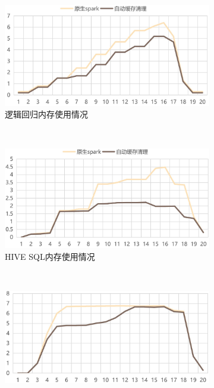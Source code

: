 \begin{figure}[!htbp]
    \centering
    \begin{subfigure}[b]{0.45\linewidth}
      \includegraphics[width=\textwidth]{Img/lr-use.jpg}
      \caption{逻辑回归内存使用情况}
      \label{fig:lr-use}
    \end{subfigure}%
    ~%
    \begin{subfigure}[b]{0.45\linewidth}
      \includegraphics[width=\textwidth]{Img/hive-use.jpg}
      \caption{HIVE SQL内存使用情况}
      \label{fig:hive-use}
    \end{subfigure}
    \\%
    \begin{subfigure}[b]{0.45\linewidth}
      \includegraphics[width=\textwidth]{Img/pagerank-use.jpg}

\end{subfigure}
\end{figure}
